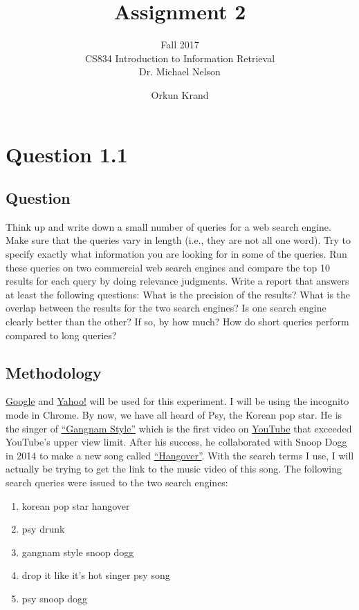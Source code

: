 \documentclass[10pt,letterpaper,bibliography=totoc]{scrartcl}
\begin{document}
\author{Orkun Krand}
\title{Assignment 2}
\subtitle{Fall 2017\\ CS834 Introduction to Information Retrieval\\ Dr. Michael Nelson}
\maketitle
\newpage

\section{Question 1.1}
\subsection {Question}
Think up and write down a small number of queries for a web search engine. Make sure that the queries vary in length (i.e., they are not all one word). Try to specify exactly what information you are looking for in some of the queries. Run these queries on two commercial web search engines and compare the top 10 results for each query by doing relevance judgments. Write a report that answers at least the following questions: What is the precision of the results? What is the overlap between the results for the two search engines? Is one search engine
clearly better than the other? If so, by how much? How do short queries perform compared to long queries?

\subsection{Methodology}
\href{www.google.com}{Google} and \href{www.yahoo.com}{Yahoo!} will be used for this experiment. I will be using the incognito mode in Chrome.
By now, we have all heard of Psy, the Korean pop star. He is the singer of \href{https://www.youtube.com/watch?v=9bZkp7q19f0}{``Gangnam Style''} which is the first video on \href{www.youtube.com}{YouTube} that exceeded YouTube's upper view limit\cite{upper-view-limit}. After his success, he collaborated with Snoop Dogg in 2014 to make a new song called \href{https://www.youtube.com/watch?v=HkMNOlYcpHg}{``Hangover''}. With the search terms I use, I will actually be trying to get the link to the music video of this song.
The following search queries were issued to the two search engines:

\begin{enumerate}
    \item korean pop star hangover
    \item psy drunk
    \item gangnam style snoop dogg
    \item drop it like it's hot singer psy song
    \item psy snoop dogg
\end{enumerate}
\end{document}
